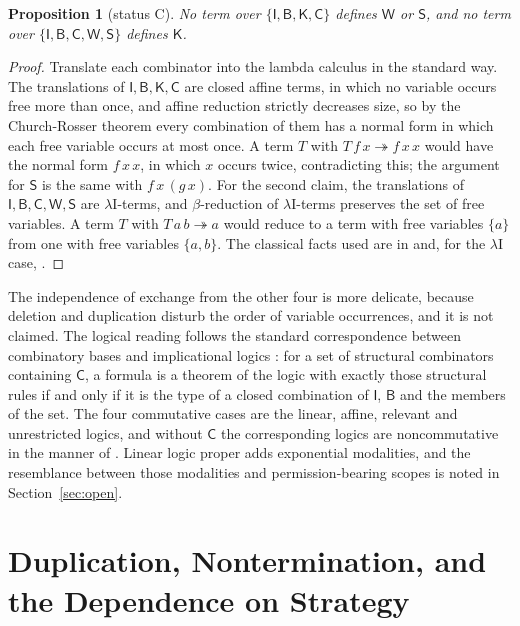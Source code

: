 \documentclass[11pt]{article}
\newtheorem{proposition}[theorem]{Proposition}
\theoremstyle{definition}
\theoremstyle{remark}
\newcommand{\cI}{\mathsf{I}}
\newcommand{\cB}{\mathsf{B}}
\newcommand{\cC}{\mathsf{C}}
\newcommand{\cK}{\mathsf{K}}
\newcommand{\cW}{\mathsf{W}}
\newcommand{\cS}{\mathsf{S}}
\newcommand{\red}{\twoheadrightarrow}
\newcommand{\Ct}{status C}
\begin{document}
\begin{proposition}[\Ct]\label{prop:sep}
No term over $\{\cI,\cB,\cK,\cC\}$ defines $\cW$ or $\cS$, and no term over $\{\cI,\cB,\cC,\cW,\cS\}$ defines $\cK$.
\end{proposition}

\begin{proof}
Translate each combinator into the lambda calculus in the standard way. The translations of $\cI,\cB,\cK,\cC$ are closed affine terms, in which no variable occurs free more than once, and affine reduction strictly decreases size, so by the Church-Rosser theorem every combination of them has a normal form in which each free variable occurs at most once. A term $T$ with $T\,f\,x\red f\,x\,x$ would have the normal form $f\,x\,x$, in which $x$ occurs twice, contradicting this; the argument for $\cS$ is the same with $f\,x\,(g\,x)$. For the second claim, the translations of $\cI,\cB,\cC,\cW,\cS$ are $\lambda\mathrm{I}$-terms, and $\beta$-reduction of $\lambda\mathrm{I}$-terms preserves the set of free variables. A term $T$ with $T\,a\,b\red a$ would reduce to a term with free variables $\{a\}$ from one with free variables $\{a,b\}$. The classical facts used are in \citet{barendregt1984} and, for the $\lambda\mathrm{I}$ case, \citet{church1941}.
\end{proof}

The independence of exchange from the other four is more delicate, because deletion and duplication disturb the order of variable occurrences, and it is not claimed. The logical reading follows the standard correspondence between combinatory bases and implicational logics \citep{curryfeys1958,hindleyseldin2008}: for a set of structural combinators containing $\cC$, a formula is a theorem of the logic with exactly those structural rules if and only if it is the type of a closed combination of $\cI$, $\cB$ and the members of the set. The four commutative cases are the linear, affine, relevant and unrestricted logics, and without $\cC$ the corresponding logics are noncommutative in the manner of \citet{lambek1958}. Linear logic proper \citep{girard1987} adds exponential modalities, and the resemblance between those modalities and permission-bearing scopes is noted in Section~\ref{sec:open}.

\section{Duplication, Nontermination, and the Dependence on Strategy}\label{sec:nontermination}
\end{document}
